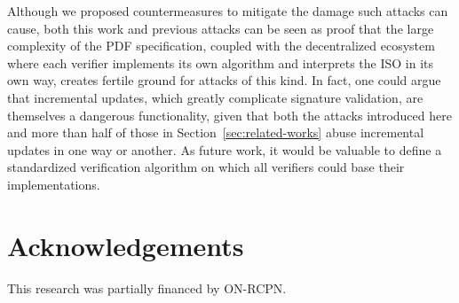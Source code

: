 \documentclass[12pt]{article}
\begin{document}
Although we proposed countermeasures to mitigate the damage such attacks can cause, both this work and previous attacks can be seen as proof that the large complexity of the PDF specification, coupled with the decentralized ecosystem where each verifier implements its own algorithm and interprets the ISO in its own way, creates fertile ground for attacks of this kind. In fact, one could argue that incremental updates, which greatly complicate signature validation, are themselves a dangerous functionality, given that both the attacks introduced here and more than half of those in Section~\ref{sec:related-works} abuse incremental updates in one way or another. As future work, it would be valuable to define a standardized verification algorithm on which all verifiers could base their implementations.

\section*{Acknowledgements}

This research was partially financed by ON-RCPN.





\end{document}
